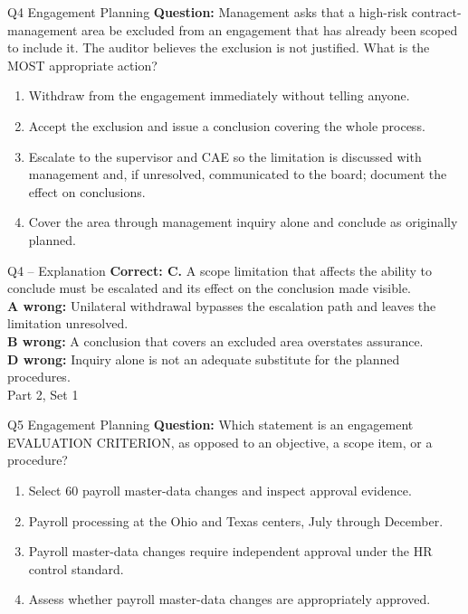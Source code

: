 \documentclass[aspectratio=169,10pt]{beamer}
\begin{document}
\begin{frame}[t]{Q4 \hfill {\scriptsize Engagement Planning}}
	\small
	\textbf{Question:} Management asks that a high-risk contract-management area be excluded from an engagement that has already been scoped to include it. The auditor believes the exclusion is not justified. What is the MOST appropriate action?
	\begin{enumerate}[label=\Alph*.,itemsep=1pt,topsep=3pt]
			\item Withdraw from the engagement immediately without telling anyone.
			\item Accept the exclusion and issue a conclusion covering the whole process.
			\item Escalate to the supervisor and CAE so the limitation is discussed with management and, if unresolved, communicated to the board; document the effect on conclusions.
			\item Cover the area through management inquiry alone and conclude as originally planned.
	\end{enumerate}
\end{frame}
\begin{frame}[t]{Q4 -- Explanation}
	\footnotesize
	\textbf{Correct: C.} A scope limitation that affects the ability to conclude must be escalated and its effect on the conclusion made visible. \\[5pt]
\textbf{A wrong:} Unilateral withdrawal bypasses the escalation path and leaves the limitation unresolved. \\[3pt]
\textbf{B wrong:} A conclusion that covers an excluded area overstates assurance. \\[3pt]
\textbf{D wrong:} Inquiry alone is not an adequate substitute for the planned procedures. \\[3pt]
	\vfill {\tiny Part 2, Set 1}
\end{frame}
\begin{frame}[t]{Q5 \hfill {\scriptsize Engagement Planning}}
	\small
	\textbf{Question:} Which statement is an engagement EVALUATION CRITERION, as opposed to an objective, a scope item, or a procedure?
	\begin{enumerate}[label=\Alph*.,itemsep=1pt,topsep=3pt]
			\item Select 60 payroll master-data changes and inspect approval evidence.
			\item Payroll processing at the Ohio and Texas centers, July through December.
			\item Payroll master-data changes require independent approval under the HR control standard.
			\item Assess whether payroll master-data changes are appropriately approved.
	\end{enumerate}
\end{frame}
\end{document}
